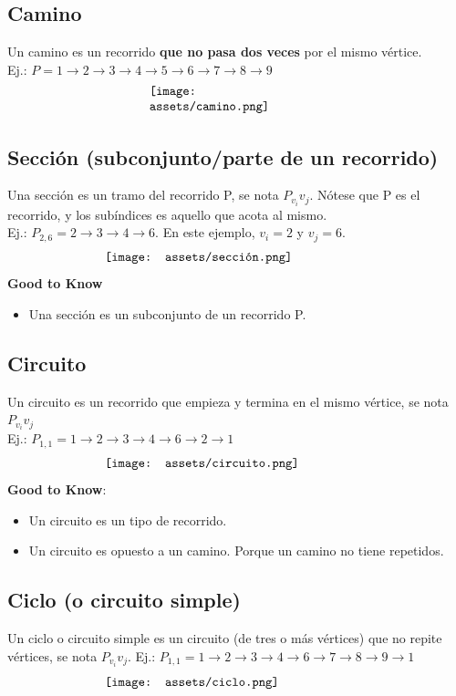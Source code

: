 \documentclass[10pt,a4paper]{article}
\begin{document}
\subsection*{Camino}
Un camino es un recorrido \textbf{que no pasa dos veces} por el mismo vértice. \\
Ej.: $P = 1 \rightarrow 2 \rightarrow 3 \rightarrow 4 \rightarrow 5 \rightarrow 6 \rightarrow 7 \rightarrow 8 \rightarrow 9$
\[\begin{minipage}[b]{0.4\textwidth}
    \texttt{[image: assets/camino.png]}
\end{minipage}\]
\subsection*{Sección (subconjunto/parte de un recorrido)}
Una sección es un tramo del recorrido P, se nota $P_{v_{i}}{v_{j}}$. Nótese que P es el recorrido, y los subíndices es aquello que acota al mismo. \\
Ej.: $P_{2,6} = 2 \rightarrow 3 \rightarrow 4 \rightarrow 6$. En este ejemplo, $v_{i} = 2$ y $v_{j} = 6$.
\[\begin{minipage}[b]{0.6\textwidth}
    \texttt{[image: assets/sección.png]}
\end{minipage}\]
\textbf{Good to Know}
\begin{itemize}
    \item Una sección es un subconjunto de un recorrido P.
\end{itemize}
\subsection*{Circuito}
Un circuito es un recorrido que empieza y termina en el mismo vértice, se nota $P_{v_{i}}{v_{j}}$ \\
Ej.: $P_{1,1} = 1 \rightarrow 2 \rightarrow 3 \rightarrow 4 \rightarrow 6 \rightarrow 2 \rightarrow 1$
\[\begin{minipage}[b]{0.6\textwidth}
    \texttt{[image: assets/circuito.png]}
\end{minipage}\]
\textbf{Good to Know}:
\begin{itemize}
    \item Un circuito es un tipo de recorrido. 
    \item Un circuito es opuesto a un camino. Porque un camino no tiene repetidos.
\end{itemize}
\subsection*{Ciclo (o circuito simple)}
Un ciclo o circuito simple es un circuito (de tres o más vértices) que no repite vértices, se nota $P_{v_{i}}{v_{j}}$.
Ej.: $P_{1,1} = 1 \rightarrow 2 \rightarrow 3 \rightarrow 4 \rightarrow 6 \rightarrow 7 \rightarrow 8 \rightarrow 9 \rightarrow 1$
\[\begin{minipage}[b]{0.6\textwidth}
    \texttt{[image: assets/ciclo.png]}
\end{minipage}\]
\end{document}
